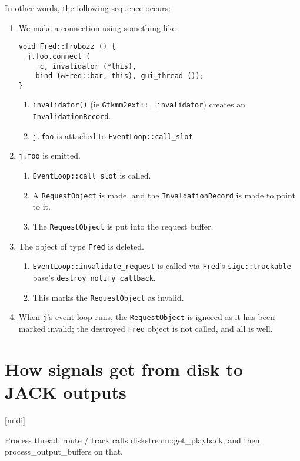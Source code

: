 \documentclass[10pt,a4paper]{book}
\newcommand{\code}[1]{\texttt{#1}}
\begin{document}
In other words, the following sequence occurs:
\begin{enumerate}

\item We make a connection using something like
\begin{lstlisting}
void Fred::frobozz () {
  j.foo.connect (
    _c, invalidator (*this),
    bind (&Fred::bar, this), gui_thread ());
}
\end{lstlisting}
\begin{enumerate}
\item \code{invalidator()} (ie \code{Gtkmm2ext::\_\_invalidator}) creates an \code{InvalidationRecord}.
\item \code{j.foo} is attached to \code{EventLoop::call\_slot}
\end{enumerate}

\item \code{j.foo} is emitted.
\begin{enumerate}
\item \code{EventLoop::call\_slot} is called.
\item A \code{RequestObject} is made, and the \code{InvaldationRecord} is made to point to it.
\item The \code{RequestObject} is put into the request buffer.
\end{enumerate}

\item The object of type \code{Fred} is deleted.
\begin{enumerate}
\item \code{EventLoop::invalidate\_request} is called via \code{Fred}'s \code{sigc::trackable} base's \code{destroy\_notify\_callback}.
\item This marks the \code{RequestObject} as invalid.
\end{enumerate}

\item When \code{j}'s event loop runs, the \code{RequestObject} is
  ignored as it has been marked invalid; the destroyed \code{Fred}
  object is not called, and all is well.

\end{enumerate}

\section{How signals get from disk to JACK outputs}

[midi]

Process thread: route / track calls diskstream::get\_playback, and then process\_output\_buffers on that.
\end{document}
